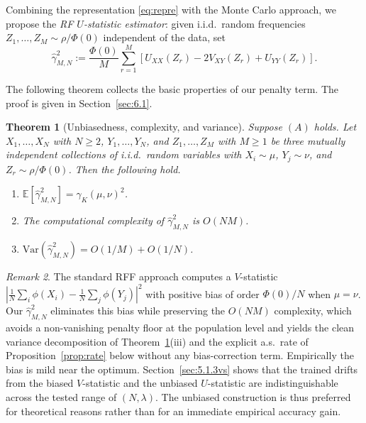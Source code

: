 \documentclass[11pt,leqno]{article}
\theoremstyle{plain}
\newtheorem{thm}{Theorem}[section]
\theoremstyle{remark}
\newtheorem{rem}[thm]{Remark}
\theoremstyle{definition}
\numberwithin{equation}{section}
\numberwithin{figure}{section}
\numberwithin{table}{section}
\numberwithin{algorithm}{section}
\newcommand{\EE}{\mathbb{E}}
\begin{document}
Combining the representation \eqref{eq:repre} with the Monte Carlo approach,
we propose the \emph{RF $U$-statistic estimator}: given i.i.d.\ random frequencies
$Z_1,\ldots,Z_M\sim\rho/\Phi(0)$ independent of the data, set
\begin{equation}
\label{eq:3.4}
 \hat{\gamma}_{M,N}^2 := \frac{\Phi(0)}{M}\sum_{r=1}^M\left[U_{XX}(Z_r) - 2V_{XY}(Z_r) + U_{YY}(Z_r)\right].
\end{equation}

The following theorem collects the basic properties of our penalty term. 
The proof is given in Section~\ref{sec:6.1}.

\begin{thm}[Unbiasedness, complexity, and variance]\label{thm:rfu_unbiased}
Suppose $(A)$ holds.
Let $X_1,\ldots,X_N$ with $N\ge 2$, $Y_1,\ldots,Y_N$, and $Z_1,\ldots,Z_M$ with $M\ge 1$
be three mutually independent collections of i.i.d.\ random variables
with $X_i\sim\mu$, $Y_j\sim\nu$, and $Z_r\sim\rho/\Phi(0)$.
Then the following hold.
\begin{enumerate}[label=\textup{(\roman*)}]
\item $\EE[\hat{\gamma}_{M,N}^2] = \gamma_K(\mu,\nu)^2$.
\item The computational complexity of $\hat{\gamma}_{M,N}^2$ is $O(NM)$.
\item $\mathrm{Var}(\hat{\gamma}_{M,N}^2) = O(1/M) + O(1/N)$.
\end{enumerate}
\end{thm}

\begin{rem}\label{rem:3.2}
The standard RFF approach computes a $V$-statistic
$|\frac{1}{N}\sum_i \phi(X_i) - \frac{1}{N}\sum_j \phi(Y_j)|^2$ with positive bias of order $\Phi(0)/N$ when $\mu=\nu$.
Our $\hat{\gamma}_{M,N}^2$ eliminates this bias while preserving the $O(NM)$ complexity,
which avoids a non-vanishing penalty floor at the population level
and yields the clean variance decomposition of Theorem~\ref{thm:rfu_unbiased}(iii)
and the explicit a.s.\ rate of Proposition~\ref{prop:rate} below
without any bias-correction term.
Empirically the bias is mild near the optimum. 
Section~\ref{sec:5.1.3vs} shows that the trained drifts from the biased $V$-statistic and the unbiased $U$-statistic
are indistinguishable across the tested range of $(N,\lambda)$.
The unbiased construction is thus preferred for theoretical reasons rather than for an immediate empirical accuracy gain.
\end{rem}
\end{document}
